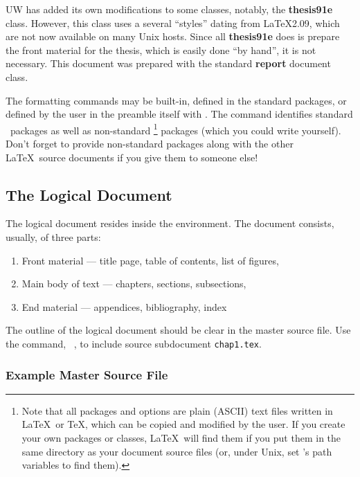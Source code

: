 UW has added its own modifications to some classes, notably, the \textbf{thesis91e} class.
However, this class uses a several ``styles'' dating from \LaTeX 2.09, which are not now available on many Unix hosts.  
Since all \textbf{thesis91e} does is prepare the front material for the thesis,
which is easily done ``by hand'', it is not necessary.
This document was prepared with the standard \textbf{report} document class.

The formatting commands may be built-in, defined in the standard packages, or defined by the user in the preamble itself with . 
The  command identifies standard \LaTeXe\ packages as well as non-standard 
\footnote{
Note that all packages and options are plain (ASCII) text files written in \LaTeX\ or \TeX , which can be copied and modified by the user.
If you create your own packages or classes, \LaTeX\ will find them if you put them in the same directory as your document source files (or, under Unix, set 's path variables to find them).
} %
packages (which you could write yourself).
Don't forget to provide non-standard packages along with the other \LaTeX\ source documents if you give them to someone else!
\subsection{The Logical Document}
The logical document resides inside the  environment.
The document consists, usually, of three parts:
\begin{enumerate}
\item Front material --- title page, table of contents, list of figures, \etc
\item Main body of text --- chapters, sections, subsections, \etc
\item End material --- appendices, bibliography, index
\end{enumerate}
The outline of the logical document should be clear in the master source file.
Use the  command, \eg\ 
\verb==, to include source subdocument \texttt{chap1.tex}.
\subsubsection{Example Master Source File}
\label{ex.master}

